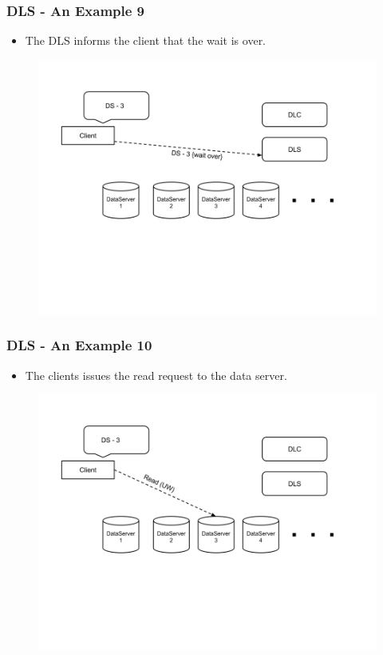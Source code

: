 \documentclass{beamer}
\begin{document}
\begin{frame}
  \frametitle{DLS - An Example 9}
  \begin{itemize}
  \item The DLS informs the client that the wait is over.
\newline
  \end{itemize}
  \begin{figure}
    \begin{center}
      \centerline{\includegraphics[scale=0.35]{img/DLS_Example10.png}}
    \end{center}
  \end{figure}
\end{frame}


\begin{frame}
  \frametitle{DLS - An Example 10}
  \begin{itemize}
  \item The clients issues the read request to the data server.
\newline
  \end{itemize}
  \begin{figure}
    \begin{center}
      \centerline{\includegraphics[scale=0.35]{img/DLS_Example11.png}}
    \end{center}
  \end{figure}

\end{frame}
\end{document}
